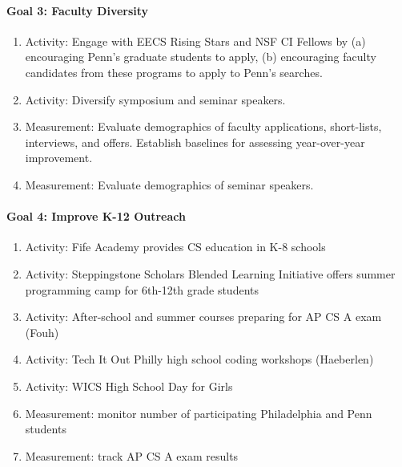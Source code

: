 \paragraph*{Goal 3: Faculty Diversity}

\begin{enumerate}[itemsep=-1mm]
\item Activity: Engage with EECS Rising Stars and NSF CI Fellows by (a) encouraging Penn’s graduate students to apply, (b) encouraging faculty candidates from these programs to apply to Penn's searches.
\item Activity: Diversify symposium and seminar speakers.
\item Measurement: Evaluate demographics of faculty applications, short-lists, interviews, and offers. Establish baselines for assessing year-over-year improvement.
\item Measurement: Evaluate demographics of seminar speakers.
\end{enumerate}

\paragraph*{Goal 4: Improve K-12 Outreach}

\begin{enumerate}[itemsep=-1mm]
\item Activity: Fife Academy provides CS education in K-8 schools
\item Activity: Steppingstone Scholars Blended Learning Initiative offers summer programming camp for 6th-12th grade students
\item Activity: After-school and summer courses preparing for AP CS A exam (Fouh)
\item Activity: Tech It Out Philly high school coding workshops (Haeberlen)
\item Activity: WICS High School Day for Girls
\item Measurement: monitor number of participating Philadelphia and Penn students
\item Measurement: track AP CS A exam results
\end{enumerate}
